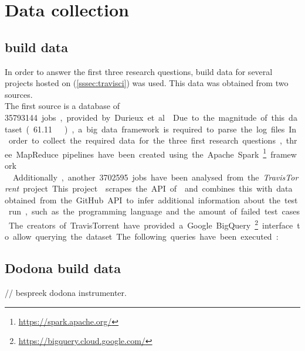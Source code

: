 
\section{Data collection}\label{sec:eval-data}

\subsection{\travisci{} build data}
In order to answer the first three research questions, build data for several projects hosted on \travisci{} (\autoref{sssec:travisci}) was used. This data was obtained from two sources.\\

\noindent The first source is a database of \SI{35793144} jobs, provided by Durieux et al \cite{travisanalysis}. Due to the magnitude of this dataset (\SI{61.11}{\gibi\byte}), a big data framework is required to parse the log files. In order to collect the required data for the three first research questions, three MapReduce pipelines have been created using the Apache Spark\footnote{\url{https://spark.apache.org/}} framework.\\



\noindent Additionally, another \SI{3702595} jobs have been analysed from the \emph{TravisTorrent} project. This project \cite{msr17challenge} scrapes the API of \travisci{} and combines this with data obtained from the GitHub API to infer additional information about the test run, such as the programming language and the amount of failed test cases. The creators of TravisTorrent have provided a Google BigQuery\footnote{\url{https://bigquery.cloud.google.com/}} interface to allow querying the dataset. The following queries have been executed:

\subsection{Dodona build data}
// bespreek dodona instrumenter.